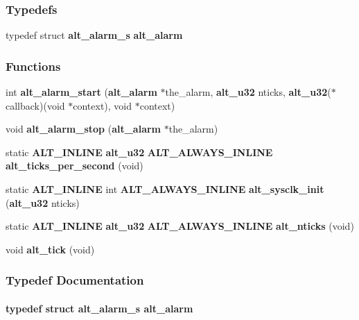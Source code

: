 \subsubsection*{Typedefs}
\begin{DoxyCompactItemize}
\item 
typedef struct {\bf alt\+\_\+alarm\+\_\+s} {\bf alt\+\_\+alarm}
\end{DoxyCompactItemize}
\subsubsection*{Functions}
\begin{DoxyCompactItemize}
\item 
int {\bf alt\+\_\+alarm\+\_\+start} ({\bf alt\+\_\+alarm} $\ast$the\+\_\+alarm, {\bf alt\+\_\+u32} nticks, {\bf alt\+\_\+u32}($\ast$callback)(void $\ast$context), void $\ast$context)
\item 
void {\bf alt\+\_\+alarm\+\_\+stop} ({\bf alt\+\_\+alarm} $\ast$the\+\_\+alarm)
\item 
static {\bf A\+L\+T\+\_\+\+I\+N\+L\+I\+NE} {\bf alt\+\_\+u32} {\bf A\+L\+T\+\_\+\+A\+L\+W\+A\+Y\+S\+\_\+\+I\+N\+L\+I\+NE} {\bf alt\+\_\+ticks\+\_\+per\+\_\+second} (void)
\item 
static {\bf A\+L\+T\+\_\+\+I\+N\+L\+I\+NE} int {\bf A\+L\+T\+\_\+\+A\+L\+W\+A\+Y\+S\+\_\+\+I\+N\+L\+I\+NE} {\bf alt\+\_\+sysclk\+\_\+init} ({\bf alt\+\_\+u32} nticks)
\item 
static {\bf A\+L\+T\+\_\+\+I\+N\+L\+I\+NE} {\bf alt\+\_\+u32} {\bf A\+L\+T\+\_\+\+A\+L\+W\+A\+Y\+S\+\_\+\+I\+N\+L\+I\+NE} {\bf alt\+\_\+nticks} (void)
\item 
void {\bf alt\+\_\+tick} (void)
\end{DoxyCompactItemize}


\subsubsection{Typedef Documentation}
\paragraph[{alt\+\_\+alarm}]{\setlength{\rightskip}{0pt plus 5cm}typedef struct {\bf alt\+\_\+alarm\+\_\+s} {\bf alt\+\_\+alarm}}\label{sys_2alt__alarm_8h_a643f0fc2597a7a9b9a4b71fe23b5f607}


